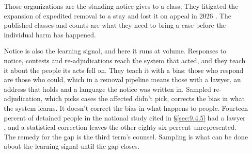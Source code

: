 Those organizations are the standing notice gives to a class. They litigated the expansion of expedited removal to a stay and lost it on appeal in 2026 \autocite{MontoyaGalvez2025Cobb,Knappenberger2026DCCir}. The published classes and counts are what they need to bring a case before the individual harm has happened.

Notice is also the learning signal, and here it runs at volume. Responses to notice, contests and re-adjudications reach the system that acted, and they teach it about the people its acts fell on. They teach it with a bias: those who respond are those who could, which in a removal pipeline means those with a lawyer, an address that holds and a language the notice was written in. Sampled re-adjudication, which picks cases the affected didn't pick, corrects the bias in what the system learns. It doesn't correct the bias in what happens to people. Fourteen percent of detained people in the national study cited in \S\ref{sec:9.4.5} had a lawyer \autocite{EaglyShafer2016Counsel}, and a statistical correction leaves the other eighty-six percent unrepresented. The remedy for the gap is the third term's counsel. Sampling is what can be done about the learning signal until the gap closes.
